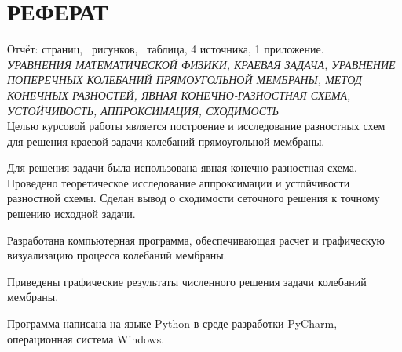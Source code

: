 
\section*{РЕФЕРАТ}
{
	Отчёт:
	\pageref{LastPage} страниц,
	\totalfigures\ рисунков,
	\totaltables\ таблица,
	4 источника,
	1 приложение.\\
	
	\textit{УРАВНЕНИЯ МАТЕМАТИЧЕСКОЙ ФИЗИКИ, КРАЕВАЯ ЗАДАЧА,  УРАВНЕНИЕ ПОПЕРЕЧНЫХ КОЛЕБАНИЙ  ПРЯМОУГОЛЬНОЙ МЕМБРАНЫ, МЕТОД КОНЕЧНЫХ РАЗНОСТЕЙ, ЯВНАЯ КОНЕЧНО-РАЗНОСТНАЯ СХЕМА, УСТОЙЧИВОСТЬ, АППРОКСИМАЦИЯ, СХОДИМОСТЬ}\\

	Целью курсовой работы является построение и исследование
разностных схем для решения краевой задачи колебаний прямоугольной мембраны.

	Для решения задачи была использована явная конечно-разностная
схема. Проведено теоретическое исследование аппроксимации и устойчивости разностной схемы. Сделан вывод о сходимости сеточного решения к точному решению исходной задачи.

	Разработана компьютерная программа, обеспечивающая расчет и
графическую визуализацию процесса колебаний мембраны.

	Приведены графические результаты численного решения задачи колебаний мембраны.

	Программа написана на языке Python в среде разработки PyCharm, операционная система Windows.
}

\setcounter{tocdepth}{3}

\newpage
\newpage
\tableofcontents
\newpage


